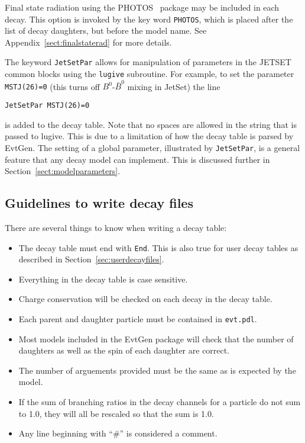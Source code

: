 Final state radiation using 
the PHOTOS~\cite{Was92} package may be included in each decay. 
This option is invoked by the key word
{\tt PHOTOS}, which is placed after the list of decay daughters, but before
the model name. See Appendix~\ref{sect:finalstaterad} for more details.

The keyword {\tt JetSetPar} 
allows for manipulation of parameters in the 
JETSET common blocks using the {\tt lugive} subroutine. 
For example, to set the parameter {\tt MSTJ(26)=0} (this turns
off $B^0$-$\bar B^0$ mixing in JetSet) the line
\begin{verbatim}
JetSetPar MSTJ(26)=0
\end{verbatim}
is added
to the decay table. Note that no spaces are allowed in the string that 
is passed to lugive. This is due to a limitation of how the decay table
is parsed by EvtGen. The setting of a global parameter, illustrated
by {\tt JetSetPar},
is a general feature that any decay model can implement. 
This is discussed further in Section~\ref{sect:modelparameters}.

\subsection{Guidelines to write decay files}

There are several things to know when writing a decay table:
\begin{itemize}
\item
The decay table must end with {\tt End}. This is
also true for user decay tables as described in
Section~\ref{sec:userdecayfiles}.
\item 
Everything in the decay table is case sensitive.
\item Charge conservation will be checked on each decay in
the decay table.
\item Each parent and daughter particle must be contained
in {\tt evt.pdl}.
\item Most models included in the EvtGen package 
will check that the number of daughters 
as well as the spin of each daughter are correct.
\item The number of arguements provided must be the same as is
expected by the model.
\item If the sum of branching ratios in the decay channels for
a particle do not sum to 1.0, they will all be rescaled so that
the sum is 1.0.
\item Any line beginning with ``\#'' is considered a comment.
\end{itemize}

